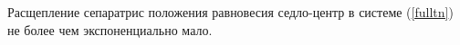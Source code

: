 \begin{consequence}
Расщепление сепаратрис положения равновесия седло-центр в системе (\ref{fulltn}) не более чем экспоненциально мало. 
\end{consequence}
